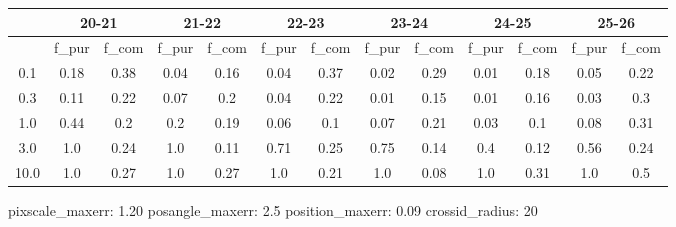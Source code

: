 \documentclass{article}
\begin{document}
\begin{figure}[H]
\centering
\begin{tabular}{|c|c|c|c|c|c|c|c|c|c|c|c|c|}
\hline
\multicolumn{1}{|c|}{} & \multicolumn{2}{|c|}{20-21} & \multicolumn{2}{|c|}{21-22} & \multicolumn{2}{|c|}{22-23} & \multicolumn{2}{|c|}{23-24} & \multicolumn{2}{|c|}{24-25} & \multicolumn{2}{|c|}{25-26}\\
\hline \hline
 & f\_pur & f\_com & f\_pur & f\_com & f\_pur & f\_com & f\_pur & f\_com & f\_pur & f\_com & f\_pur & f\_com \\
\hline
0.1 & 0.18 & 0.38 & 0.04 & 0.16 & 0.04 & 0.37 & 0.02 & 0.29 & 0.01 & 0.18 & 0.05 & 0.22\\
\hline
0.3 & 0.11 & 0.22 & 0.07 & 0.2 & 0.04 & 0.22 & 0.01 & 0.15 & 0.01 & 0.16 & 0.03 & 0.3\\
\hline
1.0 & 0.44 & 0.2 & 0.2 & 0.19 & 0.06 & 0.1 & 0.07 & 0.21 & 0.03 & 0.1 & 0.08 & 0.31\\
\hline
3.0 & 1.0 & 0.24 & 1.0 & 0.11 & 0.71 & 0.25 & 0.75 & 0.14 & 0.4 & 0.12 & 0.56 & 0.24\\
\hline
10.0 & 1.0 & 0.27 & 1.0 & 0.27 & 1.0 & 0.21 & 1.0 & 0.08 & 1.0 & 0.31 & 1.0 & 0.5\\
\hline
\end{tabular}
\caption{pixscale\_maxerr: 1.20 posangle\_maxerr: 2.5 position\_maxerr: 0.09 crossid\_radius: 20}
\end{figure}

\newpage\null\newpage
\end{document}

